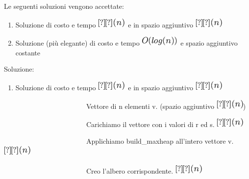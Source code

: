 \documentclass{article}
\providecommand{\tightlist}{%
  \setlength{\itemsep}{0pt}\setlength{\parskip}{0pt}}
\begin{document}
{Le seguenti soluzioni vengono accettate:}

\begin{enumerate}
\tightlist
\item
  {Soluzione di costo e tempo }\includegraphics{images/image149.png}{~e
  in spazio aggiuntivo }\includegraphics{images/image149.png}
\item
  {Soluzione (più elegante) di costo e tempo
  }\includegraphics{images/image144.png}{~e spazio aggiuntivo costante}
\end{enumerate}

{}

{Soluzione}{:}

\begin{enumerate}
\tightlist
\item
  {Soluzione di costo e tempo }\includegraphics{images/image149.png}{~e
  in spazio aggiuntivo }\includegraphics{images/image149.png}
\end{enumerate}

{}

{~~~~~~~~~~~~~~~~~~~~~~~~Vettore di n elementi v. (spazio aggiuntivo
}\includegraphics{images/image149.png}{)}

{~~~~~~~~~~~~~~~~~~~~~~~~Carichiamo il vettore con i valori di r ed s.
}\includegraphics{images/image149.png}

{~~~~~~~~~~~~~~~~~~~~~~~~Applichiamo build\_maxheap all'intero vettore
v.}\includegraphics{images/image149.png}

{~~~~~~~~~~~~~~~~~~~~~~~~Creo l'albero corrispondente.
}\includegraphics{images/image149.png}
\end{document}
